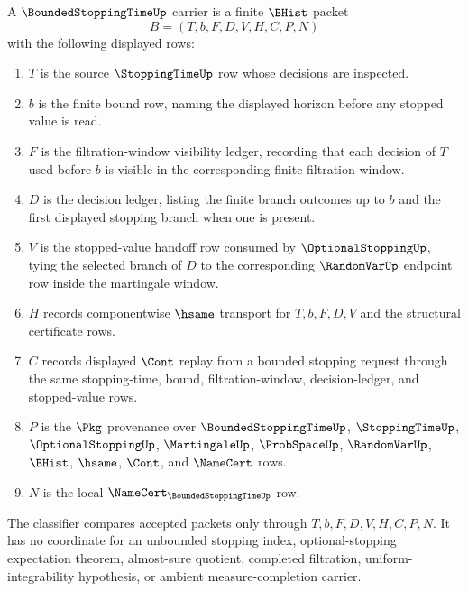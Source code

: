 \begin{definition}
\label{def:bounded-stopping-time-carrier}
A $\BoundedStoppingTimeUp$ carrier is a finite $\BHist$ packet
$$
B=(T,b,F,D,V,H,C,P,N)
$$
with the following displayed rows:
\begin{enumerate}
\item $T$ is the source $\StoppingTimeUp$ row whose decisions are inspected.
\item $b$ is the finite bound row, naming the displayed horizon before any stopped value is read.
\item $F$ is the filtration-window visibility ledger, recording that each decision of $T$ used before $b$ is visible in the corresponding finite filtration window.
\item $D$ is the decision ledger, listing the finite branch outcomes up to $b$ and the first displayed stopping branch when one is present.
\item $V$ is the stopped-value handoff row consumed by $\OptionalStoppingUp$, tying the selected branch of $D$ to the corresponding $\RandomVarUp$ endpoint row inside the martingale window.
\item $H$ records componentwise $\hsame$ transport for $T,b,F,D,V$ and the structural certificate rows.
\item $C$ records displayed $\Cont$ replay from a bounded stopping request through the same stopping-time, bound, filtration-window, decision-ledger, and stopped-value rows.
\item $P$ is the $\Pkg$ provenance over $\BoundedStoppingTimeUp$, $\StoppingTimeUp$, $\OptionalStoppingUp$, $\MartingaleUp$, $\ProbSpaceUp$, $\RandomVarUp$, $\BHist$, $\hsame$, $\Cont$, and $\NameCert$ rows.
\item $N$ is the local $\NameCert_{\BoundedStoppingTimeUp}$ row.
\end{enumerate}
The classifier compares accepted packets only through $T,b,F,D,V,H,C,P,N$. It has no coordinate for an unbounded stopping index, optional-stopping expectation theorem, almost-sure quotient, completed filtration, uniform-integrability hypothesis, or ambient measure-completion carrier.
\end{definition}

